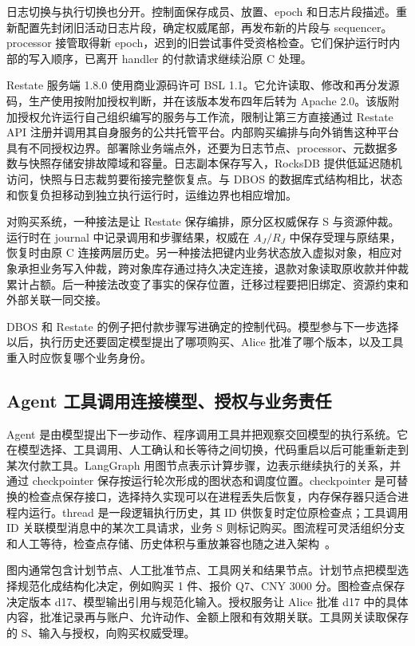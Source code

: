 日志切换与执行切换也分开。控制面保存成员、放置、epoch 和日志片段描述。重新配置先封闭旧活动日志片段，确定权威尾部，再发布新的片段与 sequencer。processor 接管取得新 epoch，迟到的旧尝试事件受资格检查。它们保护运行时内部的写入顺序，已离开 handler 的付款请求继续沿原 C 处理。

Restate 服务端 1.8.0 使用商业源码许可 BSL 1.1。它允许读取、修改和再分发源码，生产使用按附加授权判断，并在该版本发布四年后转为 Apache 2.0。该版附加授权允许运行自己组织编写的服务与工作流，限制让第三方直接通过 Restate API 注册并调用其自身服务的公共托管平台。内部购买编排与向外销售这种平台具有不同授权边界。部署除业务端点外，还要为日志节点、processor、元数据多数与快照存储安排故障域和容量。日志副本保存写入，RocksDB 提供低延迟随机访问，快照与日志裁剪要衔接完整恢复点。与 DBOS 的数据库式结构相比，状态和恢复负担移动到独立执行运行时，运维边界也相应增加。

对购买系统，一种接法是让 Restate 保存编排，原分区权威保存 S 与资源仲裁。运行时在 journal 中记录调用和步骤结果，权威在 $A_J/R_J$ 中保存受理与原结果，恢复时由原 C 连接两层历史。另一种接法把键内业务状态放入虚拟对象，相应对象承担业务写入仲裁，跨对象库存通过持久决定连接，退款对象读取原收款并仲裁累计占额。后一种接法改变了事实的保存位置，迁移过程要把旧绑定、资源约束和外部关联一同交接。

DBOS 和 Restate 的例子把付款步骤写进确定的控制代码。模型参与下一步选择以后，执行历史还要固定模型提出了哪项购买、Alice 批准了哪个版本，以及工具重入时应恢复哪个业务身份。

\subsection{Agent 工具调用连接模型、授权与业务责任}

Agent 是由模型提出下一步动作、程序调用工具并把观察交回模型的执行系统。它在模型选择、工具调用、人工确认和长等待之间切换，代码重启以后可能重新走到某次付款工具。LangGraph 用图节点表示计算步骤，边表示继续执行的关系，并通过 checkpointer 保存按运行轮次形成的图状态和调度位置。checkpointer 是可替换的检查点保存接口，选择持久实现可以在进程丢失后恢复，内存保存器只适合进程内运行。thread 是一段逻辑执行历史，其 ID 供恢复时定位原检查点；工具调用 ID 关联模型消息中的某次工具请求，业务 S 则标记购买。图流程可灵活组织分支和人工等待，检查点存储、历史体积与重放兼容也随之进入架构~\cite{ch21-langgraph}。

图内通常包含计划节点、人工批准节点、工具网关和结果节点。计划节点把模型选择规范化成结构化决定，例如购买  1 件、报价 Q7、CNY 3000 分。图检查点保存决定版本 d17、模型输出引用与规范化输入。授权服务让 Alice 批准 d17 中的具体内容，批准记录再与账户、允许动作、金额上限和有效期关联。工具网关读取保存的 S、输入与授权，向购买权威受理。

